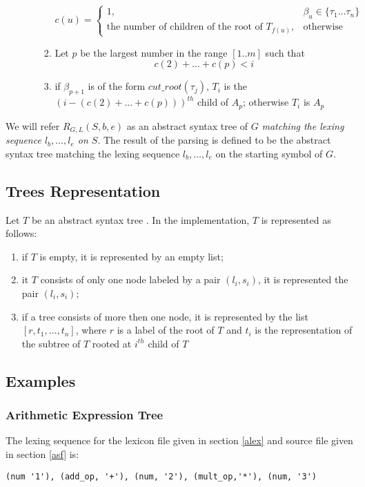 \documentclass[a4paper,10pt]{article}
\begin{document}
\begin{enumerate}
\begin{itemize}
\begin{enumerate}
\[
c(u) = 
\begin{cases}
             1,& \beta_u \in \{\tau_1 \dots \tau_n\} \\
  \text{the number of children of the root of } T_{f(u)},          & \text{otherwise}
\end{cases}
\]
\item Let $p$ be the largest number in the range $[1..m]$ such that $$c(2) + \ldots + c(p) < i$$
\item if $\beta_{p+1}$ is of the form $cut\_root(\tau_j)$, $T_i$ is the $(i - (c(2) + \ldots + c(p)))^{th}$ child of $A_p$;
      otherwise $T_i$ is $A_p$

 \end{enumerate}
 \end{itemize}
 \end{enumerate}

We will refer  $R_{G,L}(S,b,e)$ as  an abstract syntax tree of $G$ \textit{matching the lexing sequence $l_b, \ldots, l_e$ on $S$}. 
The result of the parsing is defined to be the abstract syntax tree matching the lexing sequence $l_b, \ldots, l_e$ on the starting symbol of $G$.  


\subsection{Trees Representation}
Let $T$ be an abstract syntax tree .
In the implementation, $T$ is  represented as follows:
\begin{enumerate}
\item if $T$ is empty, it is represented by an empty list;
\item it $T$ consists of only one node labeled by a pair $(l_i,s_i)$, it is represented the pair $(l_i,s_i)$;
\item if a tree consists of more then one node, it is represented by the list $[r,t_1,\ldots,t_n]$, where $r$ is a label of the root of $T$ and  $t_i$ is the representation of the subtree of $T$ rooted at $i^{th}$ child of $T$ 
\end{enumerate}

\subsection{Examples}
\subsubsection{Arithmetic Expression Tree}

The lexing sequence for the  lexicon file given in section \ref{alex} and source file given in section \ref{asf} is:
\begin{verbatim}
(num '1'), (add_op, '+'), (num, '2'), (mult_op,'*'), (num, '3') 
\end{verbatim}
\end{document}
